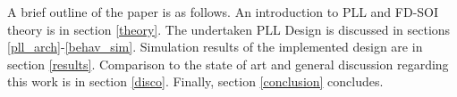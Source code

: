  A brief outline of the paper is as follows. An introduction to PLL and FD-SOI theory is in section \ref{theory}. The undertaken PLL Design is discussed in sections \ref{pll_arch}-\ref{behav_sim}. Simulation results of the implemented design are in section \ref{results}. Comparison to the state of art and general discussion regarding this work is in section \ref{disco}. Finally, section \ref{conclusion} concludes. 
%
%
%
%
%


